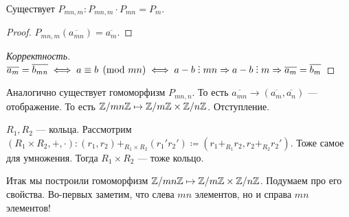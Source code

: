 Существует $P_{mn,m}: P_{mn, m} \cdot P_{mn} = P_{m}$. 
 \begin{proof}
     $P_{mn, m}(\overline{a_{mn}}) = \overline{a_m}$.
\end{proof}
\begin{proof}[Корректность]
    $\overline{a_m} = \overline{b_{mn}} \iff a \equiv b \pmod{mn} \iff a-b \divby mn \Rightarrow a-b \divby m \Rightarrow \overline{a_m} = \overline{b_m}$
\end{proof}
\slashn Аналогично существует гомоморфизм $P_{mn, n}$. То есть $\overline{a_{mn}} \rightarrow (\overline{a_m}, \overline{a_n})$ --- отображение. То есть $\mathbb{Z} / mn \mathbb{Z} \mapsto \mathbb{Z} / m\mathbb{Z} \times \mathbb{Z} / n \mathbb{Z}$.
Отступление.
\begin{definition}
    $R_1, R_2$ --- кольца. Рассмотрим  $(R_1 \times R_2, +, \cdot): (r_1, r_2) +_{R_1\times R_2} (r_1'r_2') \coloneqq (r_1+_{R_1}r_2, r_2+_{R_2}r_2')$. Тоже самое для умножения. Тогда $R_1 \times R_2$ --- тоже кольцо.
\end{definition}
\slashn
Итак мы построили гомоморфизм $\mathbb{Z} / mn \mathbb{Z} \mapsto \mathbb{Z} / m\mathbb{Z} \times \mathbb{Z} / n \mathbb{Z}$. Подумаем про его свойства. Во-первых заметим, что слева $mn$ элементов, но и справа $mn$ элементов!


